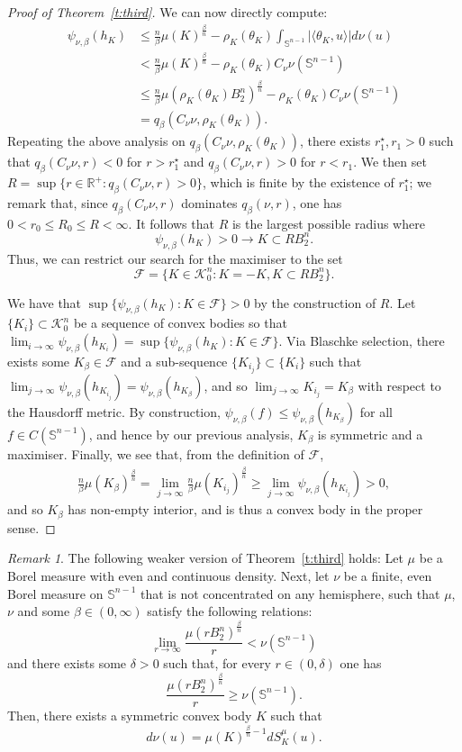 \documentclass[11pt]{amsart}
\theoremstyle{definition}
\theoremstyle{remark}
\newtheorem{remark}[theorem]{Remark}
\numberwithin{equation}{section}
\newcommand{\R}{\mathbb{R}}
\newcommand{\s}{\mathbb{S}}
\newcommand{\conbod}{\mathcal{K}^n}
\begin{document}
\begin{proof}[Proof of Theorem~\ref{t:third}]
We can now directly compute:
\begin{align*}
\psi_{\nu,\beta}(h_K)&\leq \frac{n}{\beta}\mu(K)^\frac{\beta}{n}-\rho_K(\theta_K)\int_{\s^{n-1}}|\langle \theta_K, u\rangle|d\nu(u)
\\
&< \frac{n}{\beta}\mu(K)^\frac{\beta}{n}-\rho_K(\theta_K)C_\nu\nu(\s^{n-1})
\\
&\leq \frac{n}{\beta}\mu(\rho_K(\theta_K)B_2^n)^\frac{\beta}{n}-\rho_K(\theta_K)C_\nu\nu(\s^{n-1})
\\
&=q_{\beta}(C_\nu\nu,\rho_K(\theta_K)).
\end{align*}
Repeating the above analysis on $q_{\beta}(C_\nu\nu,\rho_K(\theta_K))$, there exists $r_1^\star,r_1>0$ such that $q_{\beta}(C_\nu\nu,r) <0$ for $r>r_1^\star$ and $q_{\beta}(C_\nu\nu,r) >0$ for $r<r_1$. We then set $R=\sup\{r\in\R^{+}:q_{\beta}(C_\nu\nu,r)>0\}$, which is finite by the existence of $r_1^\star$; we remark that, since $q_{\beta}(C_\nu\nu,r)$ dominates $q_{\beta}(\nu,r)$, one has $0<r_0\leq R_0\leq R <\infty$. It follows that $R$ is the largest possible radius where $$\psi_{\nu,\beta}\left(h_{K}\right)>0\rightarrow K\subset RB_2^n.$$ 
Thus, we can restrict our search for the maximiser to the set
$$\mathcal{F}=\{K\in\conbod_0: K=-K, K\subset R B_2^n\}.$$

We have that $\sup\{\psi_{\nu,\beta}(h_K):K\in\mathcal{F}\}>0$ by the construction of $R$. Let $\{K_i\}\subset \conbod_0$ be a sequence of convex bodies so that $\lim_{i\to\infty}\psi_{\nu,\beta}(h_{K_i})=\sup\{\psi_{\nu,\beta}(h_K):K\in\mathcal{F}\}.$ Via Blaschke selection, there exists some $K_\beta\in\mathcal{F}$ and a sub-sequence $\{K_{i_j}\}\subset\{K_i\}$ such that $\lim_{j\to\infty}\psi_{\nu,\beta}(h_{K_{i_j}})=\psi_{\nu,\beta}(h_{K_\beta})$, and so $\lim_{j\to\infty}K_{i_j}=K_\beta$ with respect to the Hausdorff metric. By construction, $\psi_{\nu,\beta}(f)\leq \psi_{\nu,\beta}(h_{K_\beta})$ for all $f\in C(\s^{n-1})$, and hence by our previous analysis, $K_\beta$ is symmetric and a maximiser. Finally, we see that, from the definition of $\mathcal{F}$,
\begin{align*}
    \frac{n}{\beta}\mu(K_\beta)^\frac{\beta}{n}=\lim_{j\to\infty}\frac{n}{\beta}\mu(K_{i_j})^\frac{\beta}{n}\geq \lim_{j\to\infty}\psi_{\nu,\beta}(h_{K_{i_j}}) > 0,
\end{align*}
and so $K_\beta$ has non-empty interior, and is thus a convex body in the proper sense.
\end{proof}
\begin{remark}
The following weaker version of Theorem~\ref{t:third} holds:
Let $\mu$ be a Borel measure with even and continuous density. Next, let $\nu$ be a finite, even Borel measure on $\s^{n-1}$ that is not concentrated on any hemisphere, such that $\mu$, $\nu$ and some $\beta\in(0,\infty)$ satisfy the following relations:
$$\lim_{r\to\infty}\frac{\mu(rB_2^n)^\frac{\beta}{n}}{r} < \nu(\s^{n-1})$$
and
there exists some $\delta>0$ such that, for every $r\in(0,\delta)$ one has
$$\frac{\mu(rB_2^n)^\frac{\beta}{n}}{r} \geq \nu\left(\s^{n-1}\right).$$
Then, there exists a symmetric convex body $K$ such that
$$d\nu(u)=\mu(K)^{\frac{\beta}{n}-1}dS^{\mu}_{K}(u).$$
\end{remark}
\end{document}
